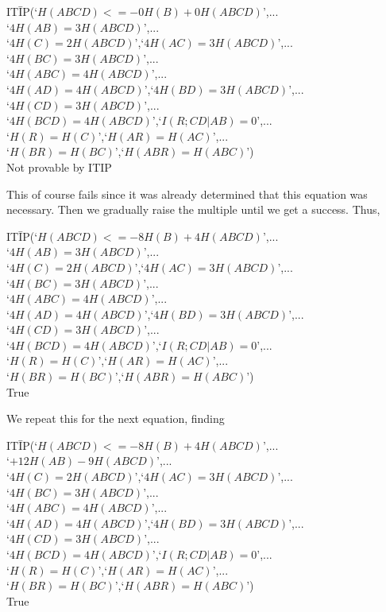 \documentclass[10pt,journal]{IEEEtran}
\begin{document}
\begin{tabbing}
IT\=IP(`$H(ABCD)<=-0H(B)+0H(ABCD)$',...\\
    \>`$4H(AB)=3H(ABCD)$',...\\
    \> `$4H(C)=2H(ABCD)$',`$4H(AC)=3H(ABCD)$',...\\
    \>`$4H(BC)=3H(ABCD)$',...\\
      \>`$4H(ABC)=4H(ABCD)$',...\\
      \>`$4H(AD)=4H(ABCD)$',`$4H(BD)=3H(ABCD)$',...\\
      \>`$4H(CD)=3H(ABCD)$',...\\
      \>`$4H(BCD)=4H(ABCD)$',`$I(R;CD|AB)=0$',...\\
      \>`$H(R)=H(C)$',`$H(AR)=H(AC)$',...\\
      \>`$H(BR)=H(BC)$',`$H(ABR)=H(ABC)$')\\
   Not provable by ITIP
\end{tabbing}
This of course fails since it was already determined that this equation was necessary.
Then we gradually raise the multiple until we get a success.  Thus,
\begin{tabbing}
IT\=IP(`$H(ABCD)<=-8H(B)+4H(ABCD)$',...\\
    \>`$4H(AB)=3H(ABCD)$',...\\
    \> `$4H(C)=2H(ABCD)$',`$4H(AC)=3H(ABCD)$',...\\
    \>`$4H(BC)=3H(ABCD)$',...\\
      \>`$4H(ABC)=4H(ABCD)$',...\\
      \>`$4H(AD)=4H(ABCD)$',`$4H(BD)=3H(ABCD)$',...\\
      \>`$4H(CD)=3H(ABCD)$',...\\
      \>`$4H(BCD)=4H(ABCD)$',`$I(R;CD|AB)=0$',...\\
      \>`$H(R)=H(C)$',`$H(AR)=H(AC)$',...\\
      \>`$H(BR)=H(BC)$',`$H(ABR)=H(ABC)$')\\
   True
\end{tabbing}

We repeat this for the next equation, finding
\begin{tabbing}
IT\=IP(`$H(ABCD)<=-8H(B)+4H(ABCD)$',...\\
    \>`$+12H(AB)-9H(ABCD)$',...\\
    \> `$4H(C)=2H(ABCD)$',`$4H(AC)=3H(ABCD)$',...\\
    \>`$4H(BC)=3H(ABCD)$',...\\
      \>`$4H(ABC)=4H(ABCD)$',...\\
      \>`$4H(AD)=4H(ABCD)$',`$4H(BD)=3H(ABCD)$',...\\
      \>`$4H(CD)=3H(ABCD)$',...\\
      \>`$4H(BCD)=4H(ABCD)$',`$I(R;CD|AB)=0$',...\\
      \>`$H(R)=H(C)$',`$H(AR)=H(AC)$',...\\
      \>`$H(BR)=H(BC)$',`$H(ABR)=H(ABC)$')\\
   True
\end{tabbing}
\end{document}
